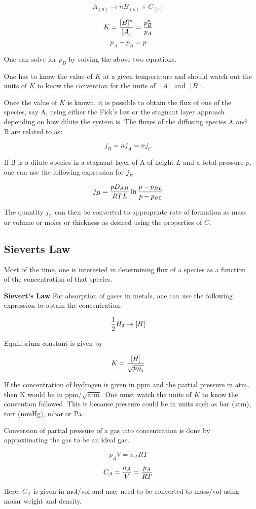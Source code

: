 $$ A_{(g)} \rightarrow n B_{(g)} + C_{(s)} $$

$$ K = { [B]^n \over [A] } = {p_B^n \over p_A} $$
$$ p_A + p_B = p$$

One can solve for $p_B$ by solving the above two equations.

One has to know the value of $K$ at a given temperature and should watch out the
units of $K$ to know the convention for the units of $[A]$ and $[B]$.

Once the value of $K$ is known, it is possible to obtain the flux of one of the
species, say A, using either the Fick's law or the stagnant layer approach
depending on how dilute the system is. The fluxes of the diffusing species A and
B are related to as:

$$ j_B = n j_A = n j_C$$

If B is a dilute species in a stagnant layer of A of height $L$ and a total
pressure $p$, one can use the following expression for $j_B$

$$ j_B = {p D_{AB} \over RTL} \ln {p - p_{BL} \over p - p_{B0}}$$

The quantity $j_C$ can then be converted to appropriate rate of formation as
mass or volume or moles or thickness as desired using the properties of $C$.

\subsection{Sieverts Law}

Most of the time, one is interested in determining flux of a species as a
function of the concentration of that species.

\textbf{Sievert's Law} For absorption of gases in metals, one can use the
following expression to obtain the concentration.


$$ {1 \over 2} H_2 \rightarrow [H]$$

Equilibrium constant is given by 

$$ K = { [H] \over \sqrt{p_{H_2}} } $$

If the concentration of hydrogen is given in ppm and the partial pressure in
atm, then K would be in ppm/$\sqrt{\text{atm}}$. One must watch the units of $K$
to know the convention followed. This is because pressure could be in units such
as bar (atm), torr (mmHg), mbar or Pa.

Conversion of partial pressure of a gas into concentration is done by
approximating the gas to be an ideal gas.


$$ p_A V = n_A R T$$

$$ C_A = {n_A \over V} = {p_A \over RT}$$

Here, $C_A$ is given in mol/vol and may need to be converted to mass/vol using
molar weight and density.

